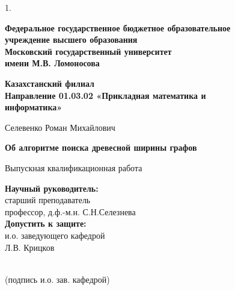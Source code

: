 \documentclass[a4paper,12pt]{article}
\begin{document}
\begin{titlepage}
		
	\begin{spacing}{1.}
	\begin{center}
	    \large \bfseries
	    Федеральное государственное бюджетное образовательное\\
	    учреждение высшего образования\\ 
        Московский государственный университет\\
        имени М.В. Ломоносова
	\end{center}
	
	\begin{center}
	    \large \bfseries
	    Казахстанский филиал\\ 
        Направление 01.03.02 «Прикладная математика и \\
        информатика»
	\end{center}
	
	\vspace{5\baselineskip}
	\begin{center}
	    \large Селевенко Роман Михайлович
	\end{center}
	
	\vspace{1\baselineskip}
	\begin{center}
	    \large \bfseries
	    Об алгоритме поиска древесной ширины графов
	\end{center}
	
	\vspace{1\baselineskip}
	\begin{center}
	    \large Выпускная квалификационная работа
	\end{center}
	
	\vspace{4\baselineskip}
	\begin{flushright}
	    \textbf{Научный руководитель:} \\старший преподаватель \\
	    профессор, д.ф.-м.н. С.Н.Селезнева\\
	    \textbf{Допустить к защите:} \\
	    и.о. заведующего кафедрой\\
	    Л.В. Крицков\\
	\end{flushright}
	
	\begin{flushright}
	    \makebox[4.5cm]{\hrulefill}\\
	    (подпись и.о. зав. кафедрой)
	\end{flushright}
	

\end{spacing}
\end{titlepage}
\end{document}
